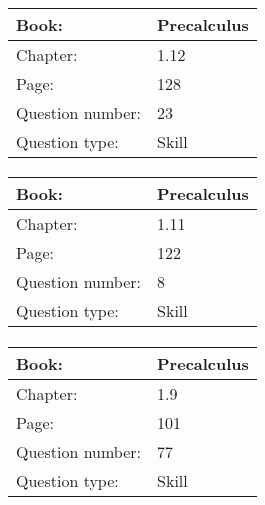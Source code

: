 \documentclass{article}
\begin{document}
            \paragraph{}
            \begin{tabularx}{1\textwidth}{
                    p{}
                    p{}
                }
                \toprule
                Book: & Precalculus
                \\
                \midrule
                Chapter: & 1.12
                \\
                \midrule
                Page: & 128
                \\
                \midrule
                Question number: & 23
                \\
                \midrule
                Question type: & Skill
                \\
                \bottomrule
            \end{tabularx}
            
            \paragraph{}
            \begin{tabularx}{1\textwidth}{
                    p{}
                    p{}
                }
                \toprule
                Book: & Precalculus
                \\
                \midrule
                Chapter: & 1.11
                \\
                \midrule
                Page: & 122
                \\
                \midrule
                Question number: & 8
                \\
                \midrule
                Question type: & Skill
                \\
                \bottomrule
            \end{tabularx}
            
            \paragraph{}
            \begin{tabularx}{1\textwidth}{
                    p{}
                    p{}
                }
                \toprule
                Book: & Precalculus
                \\
                \midrule
                Chapter: & 1.9
                \\
                \midrule
                Page: & 101
                \\
                \midrule
                Question number: & 77
                \\
                \midrule
                Question type: & Skill
                \\
                \bottomrule
            \end{tabularx}
            
\end{document}
